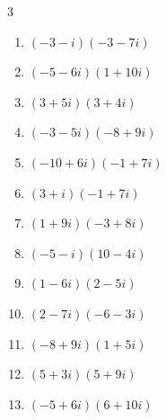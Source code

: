 \begin{multicols}{3}
\begin{enumerate}
        \phantom{$\displaystyle =141+36i$}

  \item $\displaystyle (-3-i)(-3-7i)$

        \phantom{$\displaystyle =2+24i$}

  \item $\displaystyle (-5-6i)(1+10i)$

        \phantom{$\displaystyle =55-56i$}

  \item $\displaystyle (3+5i)(3+4i)$

        \phantom{$\displaystyle =-11+27i$}

  \item $\displaystyle (-3-5i)(-8+9i)$

        \phantom{$\displaystyle =69+13i$}

  \item $\displaystyle (-10+6i)(-1+7i)$

        \phantom{$\displaystyle =-32-76i$}

\columnbreak %

  \item $\displaystyle (3+i)(-1+7i)$

        \phantom{$\displaystyle =-10+20i$}

  \item $\displaystyle (1+9i)(-3+8i)$

        \phantom{$\displaystyle =-75-19i$}

  \item $\displaystyle (-5-i)(10-4i)$

        \phantom{$\displaystyle =-54+10i$}

  \item $\displaystyle (1-6i)(2-5i)$

        \phantom{$\displaystyle =-28-17i$}

  \item $\displaystyle (2-7i)(-6-3i)$

        \phantom{$\displaystyle =-33+36i$}

  \item $\displaystyle (-8+9i)(1+5i)$

        \phantom{$\displaystyle =-53-31i$}

  \item $\displaystyle (5+3i)(5+9i)$

        \phantom{$\displaystyle =-2+60i$}

  \item $\displaystyle (-5+6i)(6+10i)$


\end{enumerate}
\end{multicols}

